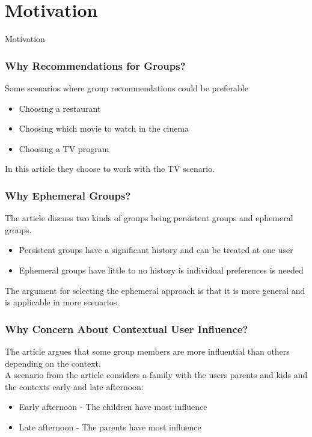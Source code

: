 \section{Motivation}

\begin{frame}
     \begin{center}
     	\huge Motivation
     \end{center}
\end{frame}

\begin{frame}
	\frametitle{Why Recommendations for Groups?}
	Some scenarios where group recommendations could be preferable
	\begin{itemize}
		\item Choosing a restaurant 
		\item Choosing which movie to watch in the cinema
		\item Choosing a TV program
	\end{itemize}
	In this article they choose to work with the TV scenario.
\end{frame}

\begin{frame}
	\frametitle{Why Ephemeral Groups?}
	The article discuss two kinds of groups being persistent groups and ephemeral groups.
	
	\begin{itemize}
		\item Persistent groups have a significant history and can be treated at one user
		\item Ephemeral groups have little to no history is individual preferences is needed
	\end{itemize}
	
	The argument for selecting the ephemeral approach is that it is more general and is applicable in more scenarios.
	
\end{frame}

\begin{frame}
	\frametitle{Why Concern About Contextual User Influence?}
	The article argues that some group members are more influential than others depending on the context.\\ 
	
	A scenario from the article considers a family with the users parents and kids and the contexts early and late afternoon:
	\begin{itemize}
	\item Early afternoon - The children have most influence
	\item Late afternoon - The parents have most influence
	\end{itemize}
	
\end{frame}

